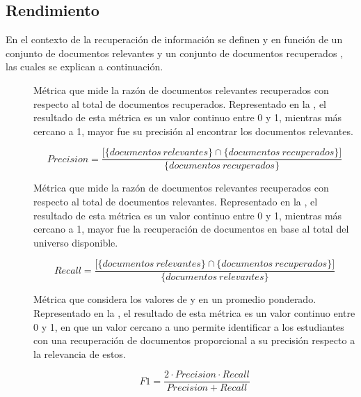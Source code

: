 \subsection{Rendimiento}
\label{subsec:rendimiento}
En el contexto de la recuperación de información se definen  y  en función de un conjunto de documentos relevantes y un conjunto de documentos recuperados \parencite{powers2011evaluation}, las cuales se explican a continuación.  

\begin{description}
	\item [] Métrica que mide la razón de documentos relevantes recuperados con 
respecto al total de documentos recuperados. Representado en la , el resultado de esta métrica es un valor continuo entre 0 y 1, mientras más cercano a 1, mayor fue su precisión al encontrar los documentos relevantes.

	\begin{equation}
	Precision = \frac{\big[\big\{documentos \ relevantes\big\} \cap \big\{documentos \ recuperados\big\}\big]}{\big\{documentos \ recuperados\big\}}
	\label{eq:precision}
	\end{equation}

	\item [] Métrica que mide la razón de documentos relevantes recuperados con 
respecto al total de documentos relevantes. Representado en la , el resultado de esta métrica es un valor continuo entre 0 y 1, mientras más cercano a 1, mayor fue la recuperación de documentos en base al total del universo disponible.

	\begin{equation}
	Recall = \frac{\big[\big\{documentos \ relevantes\big\} \cap \big\{documentos \ recuperados\big\}\big]}{\big\{documentos \ relevantes\big\}}
	\label{eq:recall}
	\end{equation}

	\item [] Métrica que considera los valores de  y  en un promedio ponderado. Representado en la , el resultado de esta métrica es un valor continuo entre 0 y 1, en que un valor cercano a uno permite identificar a los estudiantes con una recuperación de documentos proporcional a su precisión respecto a la relevancia de estos.  

	\begin{equation}
	F1 = \frac{2 \cdot Precision\cdot Recall}{Precision+ Recall}
	\label{eq:F1}
	\end{equation}
 
\end{description}

